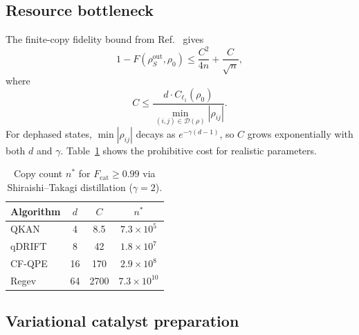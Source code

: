 \documentclass[a4paper,twocolumn]{quantumarticle}
\newenvironment{ruledtabular}{}{}%
\providecommand{\colrule}{\hline}
\begin{document}
\subsection{Resource bottleneck}
\label{sec:bottleneck}

The finite-copy fidelity bound from Ref.~\cite{Shiraishi2024} gives
\begin{equation}
1 - F(\rho_S^\mathrm{out}, \rho_0) \leq \frac{C^2}{4n} + \frac{C}{\sqrt{n}},
\label{eq:finite_n_fidelity}
\end{equation}
where
\begin{equation}
C \leq \frac{d \cdot C_{\ell_1}(\rho_0)}{\displaystyle\min_{(i,j) \in \mathcal{D}(\rho)} |\rho_{ij}|}.
\label{eq:C_bound}
\end{equation}
For dephased states, $\min|\rho_{ij}|$ decays as $e^{-\gamma(d-1)}$, so $C$ grows exponentially with both $d$ and $\gamma$.
Table~\ref{tab:bottleneck} shows the prohibitive cost for realistic parameters.

\begin{table}[tb]
\caption{Copy count $n^*$ for $F_\mathrm{cat} \geq 0.99$ via Shiraishi--Takagi distillation ($\gamma = 2$).}
\label{tab:bottleneck}
\centering\footnotesize
\setlength{\tabcolsep}{3pt}
\begin{ruledtabular}
\begin{tabular}{lccc}
Algorithm & $d$ & $C$ & $n^*$ \\
\colrule
QKAN & 4 & 8.5 & $7.3 \times 10^5$ \\
qDRIFT & 8 & 42 & $1.8 \times 10^7$ \\
CF-QPE & 16 & 170 & $2.9 \times 10^8$ \\
Regev & 64 & 2700 & $7.3 \times 10^{10}$ \\
\end{tabular}
\end{ruledtabular}
\end{table}


\subsection{Variational catalyst preparation}
\label{sec:variational}
\end{document}
